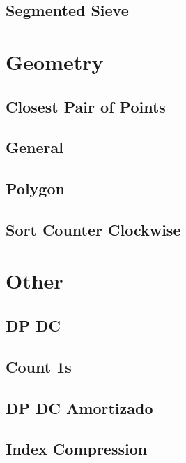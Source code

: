 \subsection{	Segmented Sieve}
\raggedbottom
\hrulefill

\section{Geometry}
\subsection{	Closest Pair of Points}
\raggedbottom
\hrulefill
\subsection{	General}
\raggedbottom
\hrulefill
\subsection{	Polygon}
\raggedbottom
\hrulefill
\subsection{	Sort Counter Clockwise}
\raggedbottom
\hrulefill

\section{Other}
\subsection{	DP DC}
\raggedbottom
\hrulefill
\subsection{	Count 1s}
\raggedbottom
\hrulefill
\subsection{	DP DC Amortizado}
\raggedbottom
\hrulefill
\subsection{	Index Compression}
\raggedbottom
\hrulefill
